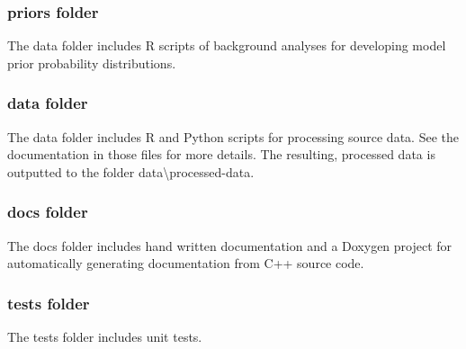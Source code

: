 \subsubsection*{{\ttfamily priors} folder}

The {\ttfamily data} folder includes R scripts of background analyses for developing model prior probability distributions.

\subsubsection*{{\ttfamily data} folder}

The {\ttfamily data} folder includes R and Python scripts for processing source data. See the documentation in those files for more details. The resulting, processed data is outputted to the folder {\ttfamily data\textbackslash{}processed-\/data}.

\subsubsection*{{\ttfamily docs} folder}

The {\ttfamily docs} folder includes hand written documentation and a Doxygen project for automatically generating documentation from C++ source code.

\subsubsection*{{\ttfamily tests} folder}

The {\ttfamily tests} folder includes unit tests. 